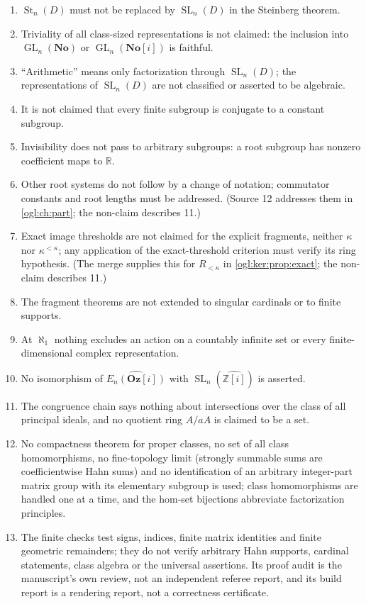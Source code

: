 \documentclass[11pt,oneside]{article}
\numberwithin{equation}{section}
\theoremstyle{definition}
\theoremstyle{remark}
\newcommand{\No}{\mathbf{No}}
\newcommand{\GOz}{\mathbf{Oz}[i]}
\newcommand{\SC}{\No[i]}
\newcommand{\Z}{\mathbb Z}
\newcommand{\R}{\mathbb R}
\newcommand{\GL}{\operatorname{GL}}
\newcommand{\SL}{\operatorname{SL}}
\newcommand{\St}{\operatorname{St}}
\begin{document}
\begin{enumerate}[leftmargin=*,widest=00,label=11.\arabic*]
differs from the kernel of $\St_n(A)\to E_n(A)$, which is not computed.
\item $\St_n(D)$ must not be replaced by $\SL_n(D)$ in the Steinberg theorem.
\item Triviality of all class-sized representations is not claimed: the inclusion
into $\GL_n(\No)$ or $\GL_n(\SC)$ is faithful.
\item ``Arithmetic'' means only factorization through $\SL_n(D)$; the
representations of $\SL_n(D)$ are not classified or asserted to be algebraic.
\item It is not claimed that every finite subgroup is conjugate to a constant
subgroup.
\item Invisibility does not pass to arbitrary subgroups: a root subgroup has
nonzero coefficient maps to $\R$.
\item Other root systems do not follow by a change of notation; commutator
constants and root lengths must be addressed. (Source 12 addresses them in
\cref{ogl:ch:part}; the non-claim describes 11.)
\item Exact image thresholds are not claimed for the explicit fragments, neither
$\kappa$ nor $\kappa^{<\kappa}$; any application of the exact-threshold criterion
must verify its ring hypothesis. (The merge supplies this for $R_{<\kappa}$ in
\cref{ogl:ker:prop:exact}; the non-claim describes 11.)
\item The fragment theorems are not extended to singular cardinals or to finite
supports.
\item At $\aleph_1$ nothing excludes an action on a countably infinite set or
every finite-dimensional complex representation.
\item No isomorphism of $\widehat{E_n(\GOz)}$ with $\SL_n(\widehat{\Z[i]})$ is
asserted.
\item The congruence chain says nothing about intersections over the class of all
principal ideals, and no quotient ring $A/aA$ is claimed to be a set.
\item No compactness theorem for proper classes, no set of all class
homomorphisms, no fine-topology limit (strongly summable sums are coefficientwise
Hahn sums) and no identification of an arbitrary integer-part matrix group with
its elementary subgroup is used; class homomorphisms are handled one at a time,
and the hom-set bijections abbreviate factorization principles.
\item The finite checks test signs, indices, finite matrix identities and finite
geometric remainders; they do not verify arbitrary Hahn supports, cardinal
statements, class algebra or the universal assertions. Its proof audit is the
manuscript's own review, not an independent referee report, and its build report
is a rendering report, not a correctness certificate.
\end{enumerate}
\end{document}
